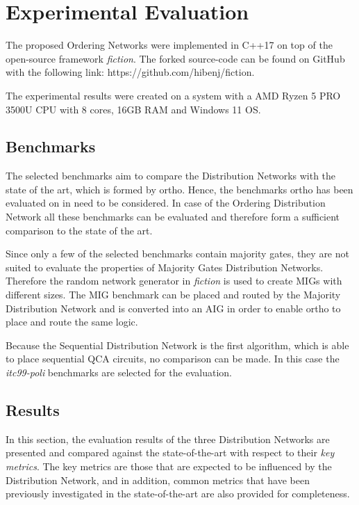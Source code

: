 \chapter{Experimental Evaluation}\label{chapter:ExpEval}

The proposed Ordering Networks were implemented in C++17 on top of the open-source framework \textit{fiction}. The forked source-code can be found on GitHub with the following link: https://github.com/hibenj/fiction. 

The experimental results were created on a system with a AMD Ryzen 5 PRO 3500U CPU with 8 cores, 16GB RAM and Windows 11 OS.

\section{Benchmarks}
The selected benchmarks aim to compare the Distribution Networks with the state of the art, which is formed by ortho. Hence, the benchmarks \cite{fontes, trindade2016placement, epfl, iscas} ortho has been evaluated on in \cite{ortho} need to be considered. In case of the Ordering Distribution Network all these benchmarks can be evaluated and therefore form a sufficient comparison to the state of the art.

Since only a few of the selected benchmarks contain majority gates, they are not suited to evaluate the properties of Majority Gates Distribution Networks. Therefore the random network generator in \textit{fiction} is used to create MIGs with different sizes. The MIG benchmark can be placed and routed by the Majority Distribution Network and is converted into an AIG in order to enable ortho to place and route the same logic.

Because the Sequential Distribution Network is the first algorithm, which is able to place sequential QCA circuits, no comparison can be made. In this case the \textit{itc99-poli} \cite{itc_poli} benchmarks are selected for the evaluation.

\section{Results}
In this section, the evaluation results of the three Distribution Networks are presented and compared against the state-of-the-art with respect to their \textit{key metrics}. The key metrics are those that are expected to be influenced by the Distribution Network, and in addition, common metrics that have been previously investigated in the state-of-the-art are also provided for completeness.

